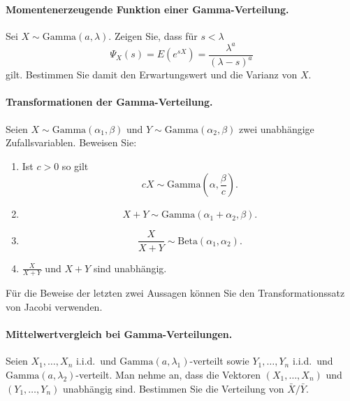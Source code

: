 \paragraph{Momentenerzeugende Funktion einer Gamma-Verteilung. }
Sei $X \sim \textrm{Gamma}(a, \lambda)$. Zeigen Sie, dass für $s<\lambda$
\begin{equation*}
    \Psi_X(s) = E \left( e^{sX} \right) = \frac{\lambda^a}{ (\lambda-s)^a}
\end{equation*}
gilt. Bestimmen Sie damit den Erwartungswert und die Varianz von $X$. %

\paragraph{Transformationen der Gamma-Verteilung. } Seien $X \sim
\textrm{Gamma}(\alpha_1, \beta)$ und $Y \sim \textrm{Gamma}(\alpha_2, \beta)$
zwei unabhängige Zufallsvariablen. Beweisen Sie:
\begin{enumerate}
    \item Ist $c>0$ so gilt
        \begin{equation*}
            c X \sim \text{Gamma}(\alpha, \frac{\beta}{c}).
        \end{equation*}
    \item \begin{equation*}
            X + Y \sim \text{Gamma}(\alpha_1 + \alpha_2, \beta).
        \end{equation*}
    \item \begin{equation*}
            \frac{X}{X+Y} \sim \text{Beta}(\alpha_1, \alpha_2).
        \end{equation*}
    \item $\frac{X}{X+Y}$ und $X+Y$ sind unabhängig. 
\end{enumerate}
Für die Beweise der letzten zwei Aussagen können Sie den Transformationssatz von Jacobi
verwenden. 

\paragraph{Mittelwertvergleich bei Gamma-Verteilungen. }
Seien $X_1,\ldots,X_n$ i.i.d.\ und $\textrm{Gamma}(a, \lambda_1)$-verteilt sowie
$Y_1,\ldots,Y_n$ i.i.d.\ und $\textrm{Gamma}(a,\lambda_2)$-verteilt. Man nehme an,
dass die Vektoren $(X_1,\ldots,X_n)$ und $(Y_1,\ldots,Y_n)$ unabhängig sind. 
Bestimmen Sie die Verteilung von $\bar X/\bar Y$.

